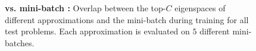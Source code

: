 \begin{figure}[p]
\vspace{3mm}

\begin{minipage}{0.50\textwidth}
\centering
\textbf{\cifarhun \allcnnc \sgd}\\[1mm]
\end{minipage}\hfill
\begin{minipage}{0.50\textwidth}
\centering
\textbf{\cifarhun \allcnnc \adam}\\[1mm]
\end{minipage}

\caption{\textbf{\bfvivit{} vs. mini-batch \ggn{}:}
Overlap between the top-$C$ eigenspaces of different \ggn approximations and the mini-batch \ggn during training for all test problems.
Each approximation is evaluated on $5$ different mini-batches.}
\label{fig:vivit_vs_mini_batch_ggn}
\end{figure}

